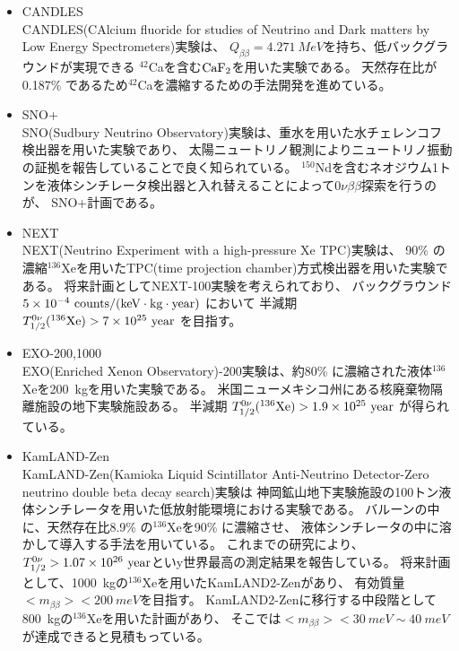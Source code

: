 \documentclass[a4paper,10pt]{jreport}
\begin{document}
\begin{itemize}
	\item CANDLES \\
	CANDLES(CAlcium fluoride for studies of Neutrino and Dark matters by Low Energy Spectrometers)実験は、
	$Q_{\beta\beta}=\SI{4.271}{MeV}$を持ち、低バックグラウンドが実現できる
	$^{42}$Caを含む$\rm{CaF_2}$を用いた実験である。
	天然存在比が0.187\% であるため$^{42}$Caを濃縮するための手法開発を進めている\cite{CANDLES}。
	
	\item SNO+ \\
	SNO(Sudbury Neutrino Observatory)実験は、重水を用いた水チェレンコフ検出器を用いた実験であり、
	太陽ニュートリノ観測によりニュートリノ振動の証拠を報告していることで良く知られている。
	$^{150}$Ndを含むネオジウム1トンを液体シンチレータ検出器と入れ替えることによって$0\nu\beta\beta$探索を行うのが、
	SNO+計画である。
	
	\item NEXT \\
	 NEXT(Neutrino Experiment with a high-pressure Xe TPC)実験は、
	 90\% の濃縮$^{136}$Xeを用いたTPC(time projection chamber)方式検出器を用いた実験である。
	 将来計画としてNEXT-100実験を考えられており、
	 バックグラウンド $5 \times 10^{-4} \ \rm{ counts/(keV \cdot kg \cdot year)}$
	 において
	 半減期 $T_{1/2}^{0\nu}(^{136}\rm{Xe}) > 7 \times 10^{25} \ \rm{year}$
	 を目指す\cite{NEXT}。
	
	\item EXO-200,1000 \\
	EXO(Enriched Xenon Observatory)-200実験は、約80\% に濃縮された液体$^{136}$Xeを\SI{200}{kg}を用いた実験である。
	米国ニューメキシコ州にある核廃棄物隔離施設の地下実験施設ある。
	半減期 $T_{1/2}^{0\nu}(^{136}\rm{Xe}) > 1.9 \times 10^{25} \ \rm{year}$
	が得られている\cite{EXO}。
	
	\item KamLAND-Zen \\
	KamLAND-Zen(Kamioka Liquid Scintillator Anti-Neutrino Detector-Zero neutrino double beta decay search)実験は
	神岡鉱山地下実験施設の100トン液体シンチレータを用いた低放射能環境における実験である。
	バルーンの中に、天然存在比8.9\% の$^{136}$Xeを90\% に濃縮させ、
	液体シンチレータの中に溶かして導入する手法を用いている。
	これまでの研究により、$T_{1/2}^{0\nu}>1.07\times10^{26}\ \rm{year}$といy世界最高の測定結果を報告している\cite{KamLAND-Zen-result}。
	将来計画として、\SI{1000}{kg}の$^{136}$Xeを用いたKamLAND2-Zenがあり、
	有効質量 $< m_{\beta\beta} > < \SI{200}{meV}$を目指す。
	KamLAND2-Zenに移行する中段階として\SI{800}{kg}の$^{136}$Xeを用いた計画があり、
	そこでは$< m_{\beta\beta} > < \SI{30}{meV} \sim \SI{40}{meV}$が達成できると見積もっている\cite{KamLAND-Zen}。
	
\end{itemize}
\end{document}
